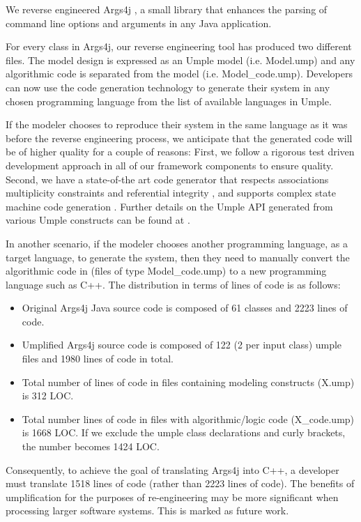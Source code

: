 We reverse engineered Args4j \cite{UmpleFrameworkSANER15p494}, a small library that enhances the parsing of command line options and arguments in any Java application.

For every class in Args4j, our reverse engineering tool has produced two different files. The model design is expressed as an Umple model (i.e. Model.ump) and any algorithmic code is separated from the model (i.e. Model\_code.ump). Developers can now use the code generation technology to generate their system in any chosen programming language from the list of available languages in Umple.

If the modeler chooses to reproduce their system in the same language as it was before the reverse engineering process, we anticipate that the generated code will be of higher quality for a couple of reasons: First, we follow a rigorous test driven development approach in all of our framework components to ensure quality. Second, we have a state-of-the art code generator that respects associations multiplicity constraints and referential integrity \cite{UmpleAssociations}, and supports complex state machine code generation \cite{Badreddin2014EnhancedComposites}. Further details on the Umple API generated from various Umple constructs can be found at \cite{UmpleAPI}.

In another scenario, if the modeler chooses another programming language, as a target language, to generate the system, then they need to manually convert the algorithmic code in (files of type Model\_code.ump) to a new programming language such as C++. The distribution in terms of lines of code is as follows:

\begin{itemize}
\item Original Args4j Java source code is composed of 61 classes and 2223 lines of code.
\item Umplified Args4j source code is composed of 122 (2 per input class) umple files and 1980 lines of code in total.
\item Total number of lines of code in files containing modeling constructs (X.ump) is 312 LOC.
\item Total number lines of code in files with algorithmic/logic code (X\_code.ump) is 1668 LOC. If we exclude the umple class declarations and curly brackets, the number becomes 1424 LOC.
\end{itemize}

Consequently, to achieve the goal of translating Args4j into C++, a developer must translate 1518 lines of code (rather than 2223 lines of code). The benefits of umplification for the purposes of re-engineering may be more significant when processing larger software systems. This is marked as future work.

